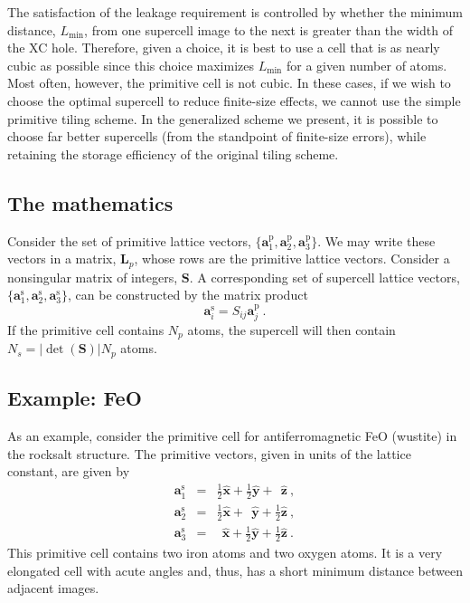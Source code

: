 The satisfaction of the leakage requirement is controlled by whether
the minimum distance, $L_{\text{min}}$, from one supercell image to the
next is greater than the width of the XC hole.  Therefore, given a
choice, it is best to use a cell that is as nearly cubic as possible
since this choice maximizes $L_{\text{min}}$ for a given number of
atoms.  Most often, however, the primitive cell is not cubic.  In
these cases, if we wish to choose the optimal supercell to reduce
finite-size effects, we cannot use the simple primitive tiling
scheme.  In the generalized scheme we present, it is possible to
choose far better supercells (from the standpoint of finite-size
errors), while retaining the storage efficiency of the original tiling
scheme.

\subsection{The mathematics}
\renewcommand{\vp}{\mathbf{a}^{\text{p}}}
\renewcommand{\vs}{\mathbf{a}^{\text{s}}} 
\renewcommand{\Smat}{\mathbf{S}}
Consider the set of primitive lattice vectors, $\{\vp_1, \vp_2,
\vp_3\}$.  We may write these vectors in a matrix, $\mathbf{L}_p$, whose
rows are the primitive lattice vectors.  Consider a nonsingular
matrix of integers, $\Smat$.  A corresponding set of supercell lattice
vectors, $\{\vs_1, \vs_2, \vs_3\}$, can be constructed by the matrix
product 
\begin{equation}
\vs_i = S_{ij} \vp_j\:.
\end{equation}
If the primitive cell contains $N_p$ atoms, the supercell will then
contain $N_s = |\det(\Smat)| N_p$ atoms.

\subsection{Example: FeO}
As an example, consider the primitive cell for antiferromagnetic FeO
(wustite) in the rocksalt structure.  The primitive vectors, given in
units of the lattice constant, are given by
\newcommand{\xv}{\hat{\mathbf{x}}} 
\newcommand{\yv}{\hat{\mathbf{y}}}
\newcommand{\zv}{\hat{\mathbf{z}}}
\begin{eqnarray}
\vs_1 & = & \frac{1}{2}\xv + \frac{1}{2}\yv +      \ \   \zv\:, \\
\vs_2 & = & \frac{1}{2}\xv +      \ \   \yv + \frac{1}{2}\zv\:, \\
\vs_3 & = &   \ \      \xv + \frac{1}{2}\yv + \frac{1}{2}\zv\:. 
\end{eqnarray}
This primitive cell contains two iron atoms and two oxygen atoms. It
is a very elongated cell with acute angles and, thus, has a short
minimum distance between adjacent images.

